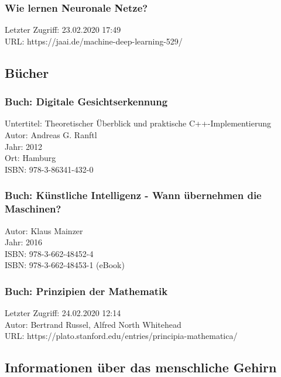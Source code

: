 		\subsubsection{Wie lernen Neuronale Netze?}
		\label{subsubsec:Wie_lernen_neuronale_netze}
		Letzter Zugriff: 23.02.2020 17:49\\
		URL: https://jaai.de/machine-deep-learning-529/

\subsection{Bücher}
\label{books}

	\subsubsection{Buch: Digitale Gesichtserkennung}
	\label{book:DigitalGesichtserkennung}
		Untertitel: Theoretischer Überblick und praktische C++-Implementierung\\
		Autor: Andreas G. Ranftl\\
		Jahr: 2012\\
		Ort: Hamburg\\
		ISBN: 978-3-86341-432-0\\

	\subsubsection{Buch: Künstliche Intelligenz - Wann übernehmen die Maschinen?}
	\label{book:KI_WannUebernehmenDieMaschinen}
		Autor: Klaus Mainzer\\
		Jahr: 2016\\
		ISBN: 978-3-662-48452-4\\
		ISBN: 978-3-662-48453-1 (eBook)

	\subsubsection{Buch: Prinzipien der Mathematik}
	\label{book:prinzipa_of_mathmatics}
		Letzter Zugriff: 24.02.2020 12:14\\
		Autor: Bertrand Russel, Alfred North Whitehead\\
		URL: https://plato.stanford.edu/entries/principia-mathematica/

\subsection{Informationen über das menschliche Gehirn}
\label{subsec:Informationen_ueber_das_menschliche_Gehirn}

